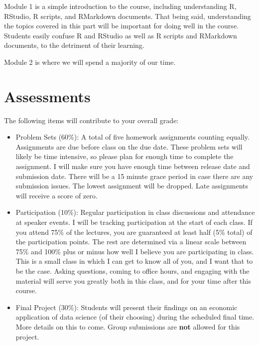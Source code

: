 \documentclass[11pt]{article}
\begin{document}
Module 1 is a simple introduction to the course, including understanding R, RStudio, R scripts, and RMarkdown documents. That being said, understanding the topics covered in this part will be important for doing well in the course. Students easily confuse R and RStudio as well as R scripts and RMarkdown documents, to the detriment of their learning.

Module 2 is where we will spend a majority of our time. 

\section*{Assessments}
The following items will contribute to your overall grade:

\begin{itemize}
    
    \item Problem Sets (60\%): A total of five homework assignments counting equally. Assignments are due before class on the due date. These problem sets will likely be time intensive, so please plan for enough time to complete the assignment. I will make sure you have enough time between release date and submission date. There will be a 15 minute grace period in case there are any submission issues. The lowest assignment will be dropped. Late assignments will receive a score of zero. 
    
    \item Participation (10\%): Regular participation in class discussions and attendance at speaker events. I will be tracking participation at the start of each class. If you attend 75\% of the lectures, you are guaranteed at least half (5\% total) of the participation points. The rest are determined via a linear scale between 75\% and 100\% plus or minus how well I believe you are participating in class. This is a small class in which I can get to know all of you, and I want that to be the case. Asking questions, coming to office hours, and engaging with the material will serve you greatly both in this class, and for your time after this course.
        
    \item Final Project (30\%): Students will present their findings on an economic application of data science (of their choosing) during the scheduled final time. More details on this to come. Group submissions are \textbf{not} allowed for this project. 
\end{itemize}
\end{document}
